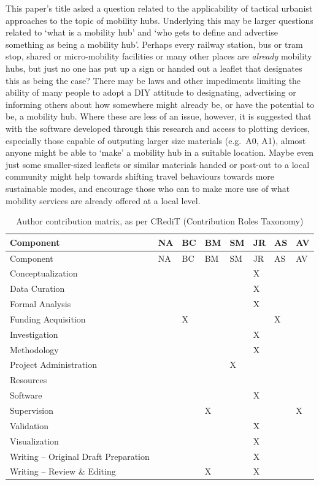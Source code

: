 \documentclass[preprint, 3p,
authoryear]{elsarticle} %
\begin{document}
This paper's title asked a question related to the applicability of
tactical urbanist approaches to the topic of mobility hubs. Underlying
this may be larger questions related to `what is a mobility hub' and
`who gets to define and advertise something as being a mobility hub'.
Perhaps every railway station, bus or tram stop, shared or
micro-mobility facilities or many other places are \emph{already}
mobility hubs, but just no one has put up a sign or handed out a leaflet
that designates this as being the case? There may be laws and other
impediments limiting the ability of many people to adopt a DIY attitude
to designating, advertising or informing others about how somewhere
might already be, or have the potential to be, a mobility hub. Where
these are less of an issue, however, it is suggested that with the
software developed through this research and access to plotting devices,
especially those capable of outputing larger size materials (e.g.~A0,
A1), almost anyone might be able to `make' a mobility hub in a suitable
location. Maybe even just some smaller-sized leaflets or similar
materials handed or post-out to a local community might help towards
shifting travel behaviours towards more sustainable modes, and encourage
those who can to make more use of what mobility services are already
offered at a local level.

\begin{longtable}[]{@{}llllllll@{}}
\caption{Author contribution matrix, as per CRediT (Contribution Roles
Taxonomy)}\tabularnewline
\toprule\noalign{}
Component & NA & BC & BM & SM & JR & AS & AV \\
\midrule\noalign{}
\endfirsthead
\toprule\noalign{}
Component & NA & BC & BM & SM & JR & AS & AV \\
\midrule\noalign{}
\endhead
\bottomrule\noalign{}
\endlastfoot
Conceptualization & & & & & X & & \\
Data Curation & & & & & X & & \\
Formal Analysis & & & & & X & & \\
Funding Acquisition & & X & & & & X & \\
Investigation & & & & & X & & \\
Methodology & & & & & X & & \\
Project Administration & & & & X & & & \\
Resources & & & & & & & \\
Software & & & & & X & & \\
Supervision & & & X & & & & X \\
Validation & & & & & X & & \\
Visualization & & & & & X & & \\
Writing -- Original Draft Preparation & & & & & X & & \\
Writing -- Review \& Editing & & & X & & X & & \\
\end{longtable}

\renewcommand\refname{References}

\end{document}
